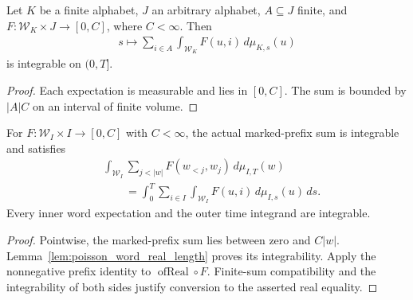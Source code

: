 \begin{lemma}
\label{lem:poisson_word_real_time_integrable}
\leanok
{}
Let $K$ be a finite alphabet, $J$ an arbitrary alphabet,
$A\subseteq J$ finite, and
$F:\mathcal W_K\times J\to[0,C]$, where $C<\infty$.
Then
\begin{align*}
 s\longmapsto\sum_{i\in A}\int_{\mathcal W_K}
 F(u,i)\,d\mu_{K,s}(u)
\end{align*}
is integrable on $(0,T]$.
\end{lemma}
\begin{proof}
\leanok
Each expectation is measurable and lies in $[0,C]$.
The sum is bounded by $|A|C$ on an interval of finite volume.
\end{proof}

\begin{theorem}
\label{thm:poisson_word_real_prefix}
\leanok
{}
For $F:\mathcal W_I\times I\to[0,C]$ with $C<\infty$, the actual
marked-prefix sum is integrable and satisfies
\begin{equation}
\label{eq:poisson_word_real_prefix}
\begin{aligned}
 &\int_{\mathcal W_I}\sum_{j<|w|}F(w_{<j},w_j)\,d\mu_{I,T}(w)\\
 &\qquad=\int_0^T\sum_{i\in I}\int_{\mathcal W_I}
 F(u,i)\,d\mu_{I,s}(u)\,ds.
\end{aligned}
\end{equation}
Every inner word expectation and the outer time integrand are integrable.
\end{theorem}
\begin{proof}
\leanok
{}
Pointwise, the marked-prefix sum lies between zero and $C|w|$.
Lemma~\ref{lem:poisson_word_real_length} proves its integrability.
Apply the nonnegative prefix identity to $\operatorname{ofReal}\circ F$.
Finite-sum compatibility and the integrability of both sides justify
conversion to the asserted real equality.
\end{proof}


